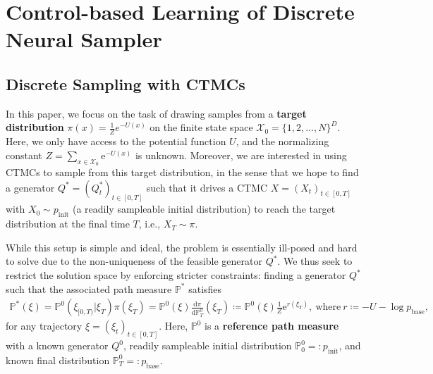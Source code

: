 \documentclass{article}
\theoremstyle{remark}
\newcommand{\e}{\mathrm{e}}
\renewcommand{\P}{\mathbb{P}}
\newcommand{\de}[2]{\frac{\mathrm{d}#1}{\mathrm{d}#2}} %
\newcommand{\cX}{\mathcal{X}}
\newcommand{\pinit}{p_\mathrm{init}}
\newcommand{\pbase}{p_\mathrm{base}}
\begin{document}
\section{Control-based Learning of Discrete Neural Sampler}
\label{sec:sampler}
%


\subsection{Discrete Sampling with CTMCs}
\label{sec:sampler_prob_setting}
In this paper, we focus on the task of drawing samples from a \textbf{target distribution} $\pi(x) = \frac{1}Ze^{-U(x)}$ on the finite state space $\cX_0 = \{1, 2, \dots, N\}^{D}$. Here, we only have access to the potential function $U$, and the normalizing constant $Z=\sum_{x\in\cX_0}\e^{-U(x)}$ is unknown. Moreover, we are interested in using CTMCs to sample from this target distribution, in the sense that we hope to find a generator $Q^* = (Q_t^*)_{t\in[0,T]}$ such that it drives a CTMC $X=(X_t)_{t\in[0,T]}$ with $X_0 \sim \pinit$ (a readily sampleable initial distribution) to reach the target distribution at the final time $T$, i.e., $X_T \sim \pi$. 

While this setup is simple and ideal, the problem is essentially ill-posed and hard to solve due to the non-uniqueness of the feasible generator $Q^*$. We thus seek to restrict the solution space by enforcing stricter constraints: finding a generator $Q^*$ such that the associated path measure $\P^*$ satisfies
\begin{align}
\P^*(\xi) = \P^0(\xi_{[0,T)}|\xi_T)\pi(\xi_T) = \P^0(\xi)\de{\pi}{\P^0_T}(\xi_T) \coloneqq \P^0(\xi) \frac{1}{Z} \e^{r(\xi_T)}, ~\text{where}~ r \coloneqq -U - \log \pbase,
\label{eq:p_star}
\end{align}
for any trajectory $\xi=(\xi_t)_{t\in[0,T]}$. Here, $\P^0$ is a \textbf{reference path measure} with a known generator $Q^0$, readily sampleable initial distribution $\P^0_0 =: \pinit$, and known final distribution $\P^0_T =: \pbase$.
\end{document}
